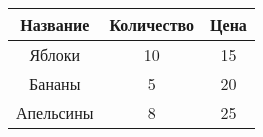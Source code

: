 \documentclass{article}
\begin{document}
\begin{tabular}{|c|c|c|}
\hline
Название & Количество & Цена \\ \hline
Яблоки & 10 & 15 \\ \hline
Бананы & 5 & 20 \\ \hline
Апельсины & 8 & 25 \\ \hline
\end{tabular}
\end{document}

